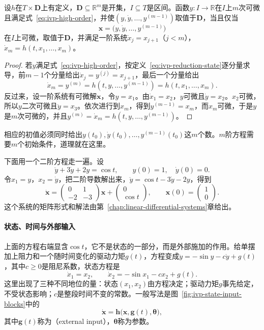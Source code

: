 \begin{lemma}[降阶]
 \label{lem:ivp-order-reduction}
 设$h$在$T\times\bm{D}$上有定义，$\bm{D}\subseteq\mathbb{R}^{m}$是开集，$I\subseteq T$是区间。函数$y:I\to\mathbb{R}$在$I$上$m$次可微且满足式~\eqref{eq:ivp-high-order}，并使$(y,\dot{y},\ldots,y^{(m-1)})$取值于$\bm{D}$，当且仅当
 \begin{equation}
 \bm{x}=\bigl(y,\dot{y},\ldots,y^{(m-1)}\bigr)
 \label{eq:ivp-reduction-state}
 \end{equation}
 在$I$上可微，取值于$\bm{D}$，并满足一阶系统$\dot{x}_j=x_{j+1}$（$j<m$），$\dot{x}_m=h(t,x_1,\ldots,x_m)$。
\end{lemma}

\begin{proof}
 若$y$满足式~\eqref{eq:ivp-high-order}，按定义~\eqref{eq:ivp-reduction-state}逐分量求导，前$m-1$个分量给出$\dot{x}_j=y^{(j)}=x_{j+1}$，最后一个分量给出
 \[
 \dot{x}_m=y^{(m)}=h(t,y,\ldots,y^{(m-1)})=h(t,x_1,\ldots,x_m).
 \]
 反过来，设一阶系统有可微解$\bm{x}$，令$y=x_1$。由$\dot{x}_1=x_2$，$y$可微且$\dot{y}=x_2$。$x_2$可微，所以$y$二次可微且$\ddot{y}=x_3$。依次进行到$x_m$，得到$y^{(m-1)}=x_m$，而$x_m$可微，于是$y$是$m$次可微的，并且$y^{(m)}=\dot{x}_m=h(t,y,\ldots,y^{(m-1)})$。
\end{proof}

相应的初值必须同时给出$y(t_0),\dot{y}(t_0),\ldots,y^{(m-1)}(t_0)$这$m$个数。$m$阶方程需要$m$个初始条件，道理就在这里。

下面用一个二阶方程走一遍。设
\[
 \ddot{y}+3\dot{y}+2y=\cos t,\qquad y(0)=1,\quad\dot{y}(0)=0.
\]
令$x_1=y$，$x_2=\dot{y}$，把二阶导数解出来，$\ddot{y}=\cos t-3\dot{y}-2y$，得到
\[
 \dot{\bm{x}}=\begin{pmatrix}0&1\\-2&-3\end{pmatrix}\bm{x}+\begin{pmatrix}0\\\cos t\end{pmatrix},\qquad
 \bm{x}(0)=\begin{pmatrix}1\\0\end{pmatrix}.
\]
这个系统的矩阵形式和解法由第~\ref{chap:linear-differential-systems}章给出。

\paragraph{状态、时间与外部输入}
上面的方程右端显含$\cos t$，它不是状态的一部分，而是外部施加的作用。给单摆加上阻力和一个随时间变化的驱动力矩$g(t)$，方程变成$\ddot{y}=-\sin y-c\dot{y}+g(t)$，其中$c\geq 0$是阻尼系数，状态方程是
\[
 \dot{x}_1=x_2,\qquad\dot{x}_2=-\sin x_1-cx_2+g(t).
\]
这里出现了三种不同地位的量：状态$(x_1,x_2)$由方程决定；驱动力矩$g$事先给定，不受状态影响；$c$是整段时间不变的常数。一般写法是图~\ref{fig:ivp-state-input-blocks}中的
\begin{equation}
 \dot{\bm{x}}=\bm{h}\bigl(\bm{x},\bm{g}(t),\bm{\theta}\bigr),
 \label{eq:ivp-input-system}
\end{equation}
其中$\bm{g}(t)$称为（external input），$\bm{\theta}$称为参数。

